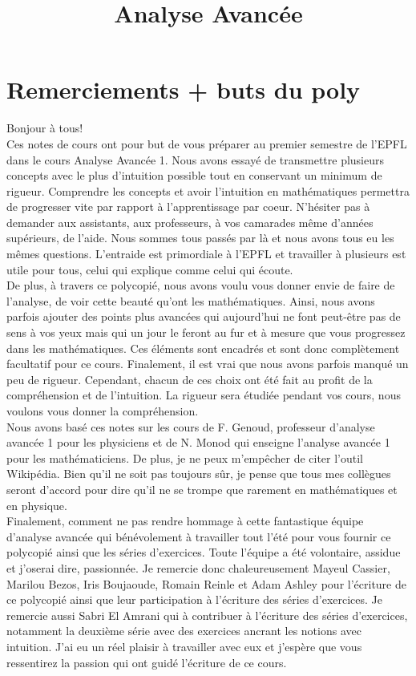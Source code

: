 \documentclass[a4paper, 12pt, french, twoside]{article}
\title{Analyse Avancée}
\begin{document}
\maketitle
\tableofcontents
\newpage
\section{Remerciements + buts du poly}
Bonjour à tous!\\

Ces notes de cours ont pour but de vous préparer au premier semestre de l'EPFL dans le cours Analyse Avancée 1. Nous avons essayé de transmettre plusieurs concepts avec le plus d'intuition possible tout en conservant un minimum de rigueur. Comprendre les concepts et avoir l'intuition en mathématiques permettra de progresser vite par rapport à l'apprentissage par coeur. N'hésiter pas à demander aux assistants, aux professeurs, à vos camarades même d'années supérieurs, de l'aide. Nous sommes tous passés par là et nous avons tous eu les mêmes questions. L'entraide est primordiale à l'EPFL et travailler à plusieurs est utile pour tous, celui qui explique comme celui qui écoute.\\ 

De plus, à travers ce polycopié, nous avons voulu vous donner envie de faire de l'analyse, de voir cette beauté qu'ont les mathématiques. Ainsi, nous avons parfois ajouter des points plus avancées qui aujourd'hui ne font peut-être pas de sens à vos yeux mais qui un jour le feront au fur et à mesure que vous progressez dans les mathématiques. Ces éléments sont encadrés et sont donc complètement facultatif pour ce cours. Finalement, il est vrai que nous avons parfois manqué un peu de rigueur. Cependant, chacun de ces choix ont été fait au profit de la compréhension et de l'intuition. La rigueur sera étudiée pendant vos cours, nous voulons vous donner la compréhension.\\

Nous avons basé ces notes sur les cours de F. Genoud, professeur d'analyse avancée 1 pour les physiciens et 
de N. Monod qui enseigne l'analyse avancée 1 pour les mathématiciens. De plus, je ne peux m'empêcher de citer l'outil Wikipédia. Bien qu'il ne soit pas toujours sûr, je pense que tous mes collègues seront d'accord pour dire qu'il ne se trompe que rarement en mathématiques et en physique. \\

Finalement, comment ne pas rendre hommage à cette fantastique équipe d'analyse avancée qui bénévolement à travailler tout l'été pour vous fournir ce polycopié ainsi que les séries d'exercices. Toute l'équipe a été volontaire, assidue et j'oserai dire, passionnée. Je remercie donc chaleureusement Mayeul Cassier, Marilou Bezos, Iris Boujaoude, Romain Reinle et Adam Ashley pour l'écriture de ce polycopié ainsi que leur participation à l'écriture des séries d'exercices. Je remercie aussi Sabri El Amrani qui à contribuer à l'écriture des séries d'exercices, notamment la deuxième série avec des exercices ancrant les notions avec intuition. J'ai eu un réel plaisir à travailler avec eux et j'espère que vous ressentirez la passion qui ont guidé l'écriture de ce cours. \\
\end{document}

